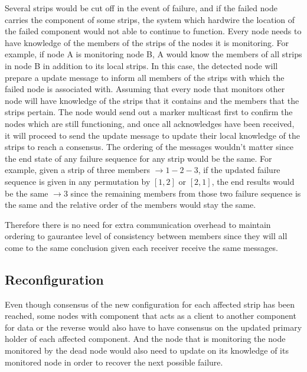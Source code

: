 Several strips would be cut off in the event of failure, and if the
failed node carries the component of some strips, the system which hardwire
the location of the failed component would not able to continue to function. 
Every node needs to have knowledge of the members of the strips of the nodes it
is monitoring. For example, if node A is monitoring node B, A would know the
members of all strips in node B in addition to its local strips.
In this case, the detected node will prepare a update message to inform all
members of the strips with which the failed node is associated with. Assuming
that every node that monitors other node will have knowledge of the strips that
it contains and the members that the strips pertain. The node would send out
a marker multicast first to confirm the nodes which are still functioning, and
once all acknowledges have been received, it will proceed to send the update
message to update their local knowledge of the strips to reach a consensus. The
ordering of the messages wouldn't matter since the end state of any failure
sequence for any strip would be the same. For example, given a strip of three
members $\rightarrow 1-2-3$, if the updated failure sequence is given in any
permutation by $[1, 2]$ or $[2, 1]$, the end results would be the same
$\rightarrow 3$ since the remaining members from those two failure sequence is
the same and the relative order of the members would stay the same.

Therefore there is no need for extra communication overhead to maintain
ordering to gaurantee level of consistency between members since they will all
come to the same conclusion given each receiver receive the same messages.


\subsection{Reconfiguration}
\label{s:reconfig}

Even though consensus of the new configuration for each affected strip has been
reached, some nodes with component that acts as a client to another component
for data or the reverse would also have to have consensus on the updated
primary holder of each affected component. And the node that is monitoring the
node monitored by the dead node would also need to update on its knowledge of
its monitored node in order to recover the next possible failure.

